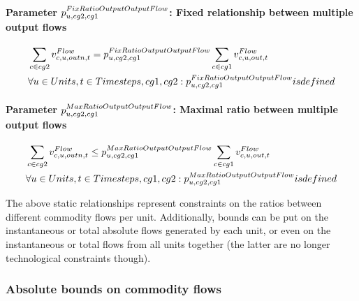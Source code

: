 \paragraph{Parameter $\pFixRatioOutputOutputFlow$: Fixed relationship between multiple output flows}
\begin{align} \label{eq:fixratiooutputoutputflow}
&\sum_{\commodity \in cg2} \vFlow[\commodity,\unit,outn,\timestep] = \pFixRatioOutputOutputFlow \sum_{\commodity \in cg1} \vFlow[\commodity,\unit,out,\timestep] \nonumber \\
&\forall \units, \timesteps, cg1, cg2: \pFixRatioOutputOutputFlow is defined
\end{align}

\paragraph{Parameter $\pMaxRatioOutputOutputFlow$: Maximal ratio between multiple output flows}
\begin{align} \label{eq:maxratiooutputoutputflow}
&\sum_{\commodity \in cg2} \vFlow[\commodity,\unit,outn,\timestep] \le \pMaxRatioOutputOutputFlow \sum_{\commodity \in cg1} \vFlow[\commodity,\unit,out,\timestep] \nonumber \\
&\forall \units, \timesteps, cg1, cg2: \pMaxRatioOutputOutputFlow is defined
\end{align}



The above static relationships represent constraints on the ratios between different commodity flows per unit. Additionally, bounds can be put on the instantaneous or total absolute flows generated by each unit, or even on the instantaneous or total flows from all units together (the latter are no longer technological constraints though).

\subsubsection{Absolute bounds on commodity flows}

